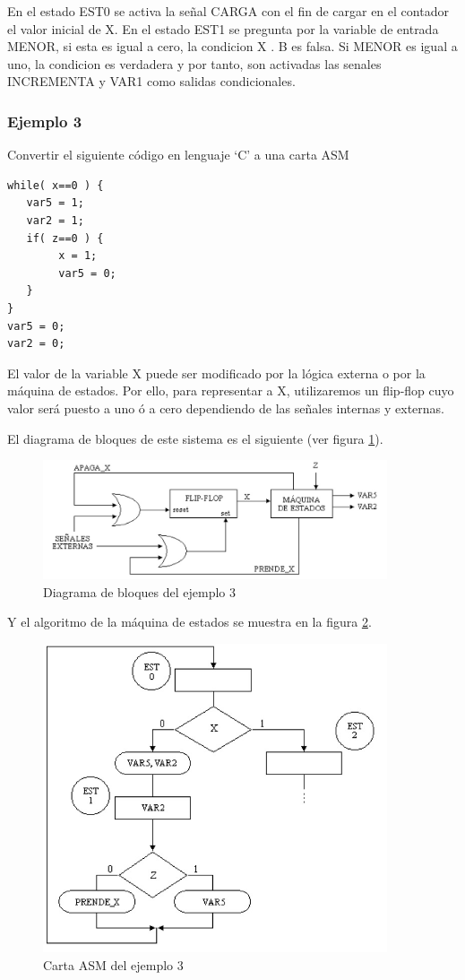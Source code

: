 \documentclass[12pt]{book}
\theoremstyle{definition}
\theoremstyle{remark}
\theoremstyle{plain}
\begin{document}
En el estado EST0 se activa la señal CARGA con el fin de cargar en el contador el valor inicial
de X. En el estado EST1 se pregunta por la variable de entrada MENOR, si esta es igual a cero, la
condicion X . B es falsa. Si MENOR es igual a uno, la condicion es verdadera y por tanto, son
activadas las senales INCREMENTA y VAR1 como salidas condicionales.

\subsubsection{Ejemplo 3}

Convertir el siguiente código en lenguaje ‘C’ a una carta ASM
\begin{verbatim}
while( x==0 ) {
   var5 = 1;
   var2 = 1;
   if( z==0 ) {
        x = 1;
        var5 = 0;
   }
}
var5 = 0;
var2 = 0;
\end{verbatim}

El valor de la variable X puede ser modificado por la lógica externa o por la
máquina de estados. Por ello, para representar a X, utilizaremos un flip-flop cuyo valor será puesto a uno ó a cero dependiendo de las señales internas y externas.

El diagrama de bloques de este sistema es el siguiente (ver figura \ref{fig22}).

\begin{figure}
\centering
\includegraphics[width=4in]{ASMbloques3.jpg}
\caption{Diagrama de bloques  del ejemplo 3}
\label{fig22}
\end{figure}

Y el algoritmo de la máquina de estados se muestra en la figura \ref{fig23}.

\begin{figure}
\centering
\includegraphics[width=4in]{ASMejemplo3.jpg}
\caption{Carta ASM  del ejemplo 3}
\label{fig23}
\end{figure}
\end{document}
